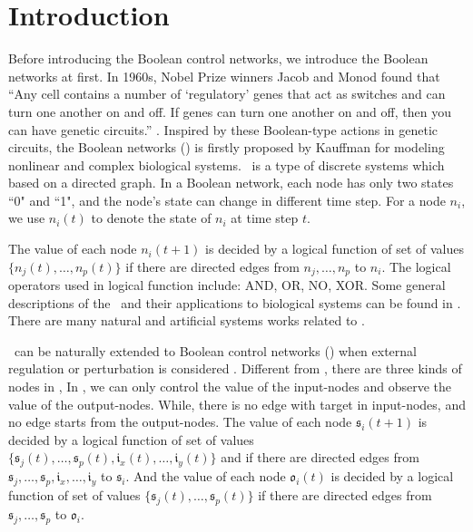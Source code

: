 \section{Introduction}
\label{sec:intro}


Before introducing the Boolean control networks, we introduce the Boolean networks at first. In 1960s, Nobel Prize winners Jacob and Monod found that ``Any cell contains a number of `regulatory' genes that act as switches and can turn one another on and off. If genes can turn one another on and off, then you can have genetic circuits.'' \cite{Jacob1961Genetic}. Inspired by these Boolean-type actions in genetic circuits, the Boolean networks (\BNs) is firstly proposed by Kauffman \cite{Kauffman1968Metabolic} for modeling nonlinear and complex biological systems. \BNs\ is a type of discrete systems which based on a directed graph. In a Boolean network, each node has only two states ``0" and ``1", and
the node's state     can change in different  time step.  For a node $n_i$, we use $n_i(t)$ to denote the state of $n_i$ at time step $t$.

The value of each node $n_i(t+1)$ is decided by a logical function of  set of  values  $\{n_j(t),\ldots,n_p(t)\}$ if  there are directed edges from $n_j,\ldots,n_p$ to $n_i$.  %
 The logical operators used in  logical function include: AND, OR, NO, XOR. %
Some general descriptions of the \BNs\ and their applications to biological systems can be found in \cite{Kauffman1968Metabolic}.
There are many natural and artificial systems works \cite{Akutsu2000Inferring, Shmulevich2002From, Faur2006Dynamical,Green2007The,Lou2010Multi} related to \BNs.
 

         \BNs\ can be naturally extended to Boolean control networks (\BCNs) when external regulation or perturbation is considered \cite{Ideker2001A}. Different from \BNs, there are three kinds of nodes in \BCNs,  In \BCNs, we can only control the value of the input-nodes and observe the value of the output-nodes. While, there is no edge with target in input-nodes, and no edge starts from the output-nodes. The value of each node $\mathfrak{s}_i(t+1)$ is decided by a logical function of set of  values  $\{\mathfrak{s}_j(t),\ldots,\mathfrak{s}_p(t),\mathfrak{i}_x(t),\ldots,\mathfrak{i}_y(t)\}$ and if there are directed edges from $\mathfrak{s}_j,\ldots,\mathfrak{s}_p,\mathfrak{i}_x,\ldots,\mathfrak{i}_y$ to $\mathfrak{s}_i$. And the value of each node $\mathfrak{o}_i(t)$ is decided by a logical function of  set of  values  $\{\mathfrak{s}_j(t),\ldots,\mathfrak{s}_p(t)\}$ if  there are directed edges from $\mathfrak{s}_j,\ldots,\mathfrak{s}_p$ to $\mathfrak{o}_i$.

